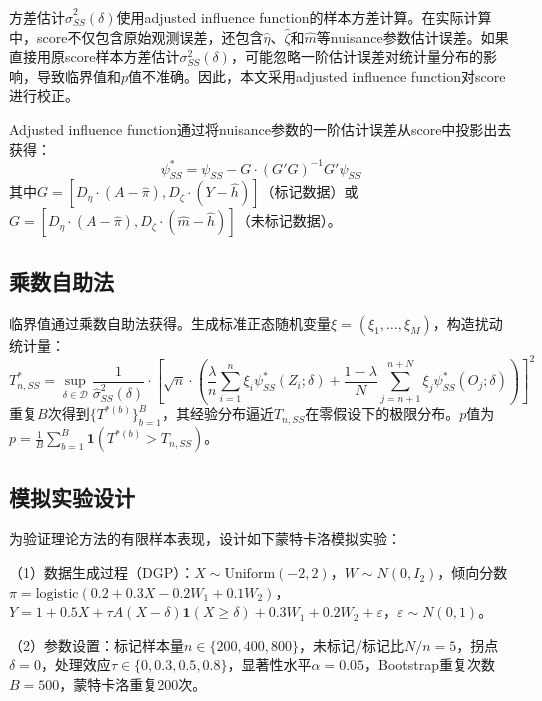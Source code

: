 \documentclass[12pt,a4paper]{ctexart}
\begin{document}
方差估计$\hat{\sigma}^2_{SS}(\delta)$使用adjusted influence function的样本方差计算。在实际计算中，score不仅包含原始观测误差，还包含$\hat{\eta}$、$\hat{\zeta}$和$\hat{m}$等nuisance参数估计误差。如果直接用原score样本方差估计$\sigma^2_{SS}(\delta)$，可能忽略一阶估计误差对统计量分布的影响，导致临界值和$p$值不准确。因此，本文采用adjusted influence function对score进行校正。

Adjusted influence function通过将nuisance参数的一阶估计误差从score中投影出去获得：
\begin{equation}
\psi^*_{SS} = \psi_{SS} - G\cdot(G'G)^{-1}G'\psi_{SS}
\label{eq:adjusted_if}
\end{equation}
其中$G = [D_\eta\cdot(A-\hat{\pi}), D_\zeta\cdot(Y-\hat{h})]$（标记数据）或$G = [D_\eta\cdot(A-\hat{\pi}), D_\zeta\cdot(\hat{m}-\hat{h})]$（未标记数据）。

\subsection{乘数自助法}

临界值通过乘数自助法获得。生成标准正态随机变量$\xi = (\xi_1,\ldots,\xi_M)$，构造扰动统计量：
\begin{equation}
T^*_{n,SS} = \sup_{\delta \in \mathcal{D}} \frac{1}{\hat{\sigma}^2_{SS}(\delta)} \cdot \left[\sqrt{n} \cdot \left(\frac{\lambda}{n}\sum_{i=1}^{n}\xi_i\psi^*_{SS}(Z_i;\delta) + \frac{1-\lambda}{N}\sum_{j=n+1}^{n+N}\xi_j\psi^*_{SS}(O_j;\delta)\right)\right]^2
\label{eq:bootstrap}
\end{equation}
重复$B$次得到$\{T^{*(b)}\}_{b=1}^B$，其经验分布逼近$T_{n,SS}$在零假设下的极限分布。$p$值为$p = \frac{1}{B}\sum_{b=1}^{B}\mathbf{1}(T^{*(b)} > T_{n,SS})$。

\subsection{模拟实验设计}

为验证理论方法的有限样本表现，设计如下蒙特卡洛模拟实验：

（1）数据生成过程（DGP）：$X \sim \mathrm{Uniform}(-2, 2)$，$W \sim N(0, I_2)$，倾向分数$\pi = \mathrm{logistic}(0.2 + 0.3X - 0.2W_1 + 0.1W_2)$，$Y = 1 + 0.5X + \tau A(X-\delta)\mathbf{1}(X\geq\delta) + 0.3W_1 + 0.2W_2 + \varepsilon$，$\varepsilon \sim N(0,1)$。

（2）参数设置：标记样本量$n \in \{200, 400, 800\}$，未标记/标记比$N/n = 5$，拐点$\delta = 0$，处理效应$\tau \in \{0, 0.3, 0.5, 0.8\}$，显著性水平$\alpha = 0.05$，Bootstrap重复次数$B = 500$，蒙特卡洛重复200次。
\end{document}
